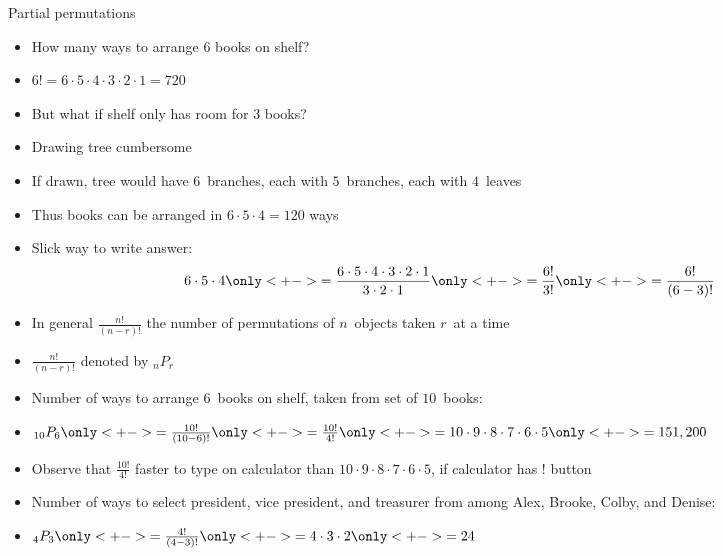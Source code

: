 \documentclass[handout]{beamer}
\theoremstyle{definition}
\begin{document}
\begin{frame}{Partial permutations}
\begin{itemize}
\item How many ways to arrange $6$ books on shelf?
\item $6!=6\cdot 5\cdot 4\cdot 3\cdot 2\cdot 1=720$
\item But what if shelf only has room for $3$ books?
\item Drawing tree cumbersome
\item If drawn, tree would have $6$~branches,
each with $5$~branches, each with $4$~leaves
\item Thus books can be arranged in $6\cdot 5\cdot 4=120$ ways
\item Slick way to write answer:
\[6\cdot 5\cdot 4
\only<+->{=\frac{6\cdot 5\cdot 4\cdot 3\cdot 2\cdot 1}
{3\cdot 2\cdot 1}}\only<+->{=\frac{6!}{3!}}
\only<+->{=\frac{6!}{\left(6-3\right)!}}\]
\item In general
$\frac{n!}{\left(n-r\right)!}$ the number of \alert{permutations
of $n$~objects taken $r$~at a time}
\item $\frac{n!}{\left(n-r\right)!}$ denoted
by $_nP_r$
\end{itemize}
\end{frame}

\begin{frame}
\begin{example}
\begin{itemize}
\item Number of ways to arrange $6$~books
on shelf, taken from set of $10$~books:
\item $_{10}P_6
\only<+->{=\frac{10!}{\left(10-6\right)!}}
\only<+->{=\frac{10!}{4!}}
\only<+->{=10\cdot 9\cdot 8\cdot 7\cdot 6\cdot 5}
\only<+->{=151,200}$
\item Observe that $\frac{10!}{4!}$ faster to type
on calculator than 
$10\cdot 9\cdot 8\cdot 7\cdot 6\cdot 5$, if calculator
has $!$ button
\end{itemize}
\end{example}
\begin{example}
\begin{itemize}
\item Number of ways to select president, vice president,
and treasurer from among Alex, Brooke, Colby, and Denise:
\item $_4P_3
\only<+->{=\frac{4!}{\left(4-3\right)!}}
\only<+->{=4\cdot 3\cdot 2}
\only<+->{=24}$
\end{itemize}
\end{example}
\end{frame}
\end{document}
